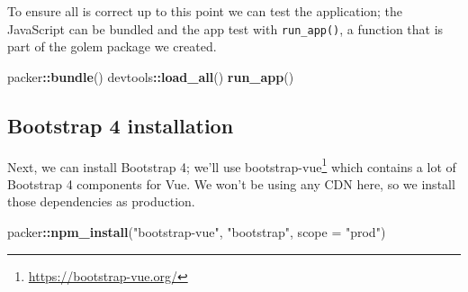 \documentclass[10pt,]{krantz}
\makeatletter
\newenvironment{Shaded}{\begin{snugshade}}{\end{snugshade}}
\newcommand{\ControlFlowTok}[1]{\textcolor[rgb]{0.27,0.27,0.27}{\textbf{#1}}}
\newcommand{\DataTypeTok}[1]{\textcolor[rgb]{0.27,0.27,0.27}{#1}}
\newcommand{\KeywordTok}[1]{\textcolor[rgb]{0.27,0.27,0.27}{\textbf{#1}}}
\newcommand{\NormalTok}[1]{#1}
\newcommand{\OperatorTok}[1]{\textcolor[rgb]{0.43,0.43,0.43}{\textbf{#1}}}
\newcommand{\StringTok}[1]{\textcolor[rgb]{0.5,0.5,0.5}{#1}}
\renewcommand{\href}[2]{#2\footnote{\url{#1}}}
\newenvironment{kframe}{%
\medskip{}
\setlength{\fboxsep}{.8em}
 \def\at@end@of@kframe{}%
 \ifinner\ifhmode%
  \def\at@end@of@kframe{\end{minipage}}%
  \begin{minipage}{\columnwidth}%
 \fi\fi%
 \def\FrameCommand##1{\hskip\@totalleftmargin \hskip-\fboxsep
 \colorbox{shadecolor}{##1}\hskip-\fboxsep
     \hskip-\linewidth \hskip-\@totalleftmargin \hskip\columnwidth}%
 \MakeFramed {\advance\hsize-\width
   \@totalleftmargin\z@ \linewidth\hsize
   \@setminipage}}%
 {\par\unskip\endMakeFramed%
 \at@end@of@kframe}
\renewenvironment{Shaded}{\begin{kframe}}{\end{kframe}}
\makeatother
\begin{document}
\begin{Shaded}
\end{Shaded}

To ensure all is correct up to this point we can test the application; the JavaScript can be bundled and the app test with \texttt{run\_app()}, a function that is part of the golem package we created.

\begin{Shaded}
\begin{Highlighting}[]
\NormalTok{packer}\OperatorTok{::}\KeywordTok{bundle}\NormalTok{()}
\NormalTok{devtools}\OperatorTok{::}\KeywordTok{load_all}\NormalTok{()}
\KeywordTok{run_app}\NormalTok{()}
\end{Highlighting}
\end{Shaded}

\hypertarget{packer-adv-shiny-vue-bs4}{%
\subsection{Bootstrap 4 installation}\label{packer-adv-shiny-vue-bs4}}

Next, we can install Bootstrap 4; we'll use \href{https://bootstrap-vue.org/}{bootstrap-vue} which contains a lot of Bootstrap 4 components for Vue. We won't be using any CDN here, so we install those dependencies as production.

\begin{Shaded}
\begin{Highlighting}[]
\NormalTok{packer}\OperatorTok{::}\KeywordTok{npm_install}\NormalTok{(}\StringTok{"bootstrap-vue"}\NormalTok{, }\StringTok{"bootstrap"}\NormalTok{, }\DataTypeTok{scope =} \StringTok{"prod"}\NormalTok{)}
\end{Highlighting}
\end{Shaded}
\end{document}
